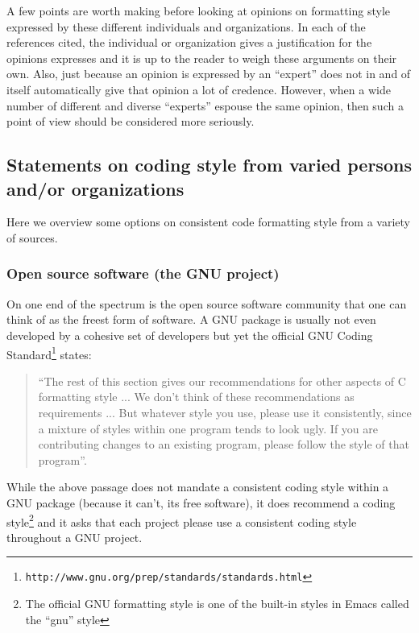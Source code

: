 A few points are worth making before looking at opinions on formatting style
expressed by these different individuals and organizations.  In each of the
references cited, the individual or organization gives a justification for the
opinions expresses and it is up to the reader to weigh these arguments on
their own.  Also, just because an opinion is expressed by an ``expert'' does
not in and of itself automatically give that opinion a lot of credence.
However, when a wide number of different and diverse ``experts'' espouse the
same opinion, then such a point of view should be considered more seriously.


%
\subsection{Statements on coding style from varied persons and/or organizations}
%

Here we overview some options on consistent code formatting style from a
variety of sources.


%
\subsubsection{Open source software (the GNU project)}
%

On one end of the spectrum is the open source software community that one can
think of as the freest form of software.  A GNU package is usually not even
developed by a cohesive set of developers but yet the official GNU Coding
Standard\footnote{{}\texttt{http://www.gnu.org/prep/standards/standards.html}}
states:

\begin{quote}

``The rest of this section gives our recommendations for other aspects of C
formatting style ... We don't think of these recommendations as requirements
... But whatever style you use, please use it consistently, since a mixture of
styles within one program tends to look ugly. If you are contributing changes
to an existing program, please follow the style of that program''.

\end{quote}

While the above passage does not mandate a consistent coding style within a
GNU package (because it can't, its free software), it does recommend a coding
style\footnote{The official GNU formatting style is one of the built-in styles
in Emacs called the ``gnu'' style} and it asks that each project please use a
consistent coding style throughout a GNU project.


